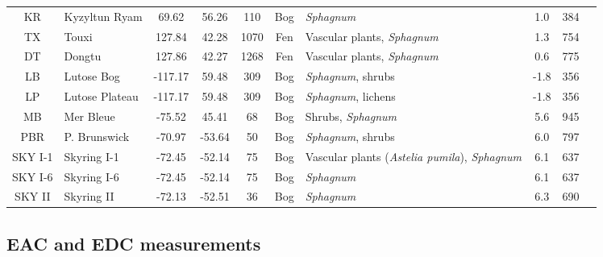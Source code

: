 \documentclass[alpha-refs]{wiley-article-rmd}
\begin{document}
\begin{refsection}
\begin{landscape}
\begin{table}
{\begin{tabular}[t]{clcccc>{\raggedright\arraybackslash}p{4cm}cc>{\raggedright\arraybackslash}p{4cm}}
\addlinespace
KR & Kyzyltun Ryam & 69.62 & 56.26 & 110 & Bog & \emph{Sphagnum} & 1.0 & 384 & \textcite{Larina.2013}\\
TX & Touxi & 127.84 & 42.28 & 1070 & Fen & Vascular plants, \emph{Sphagnum} & 1.3 & 754 & \\
DT & Dongtu & 127.86 & 42.27 & 1268 & Fen & Vascular plants, \emph{Sphagnum} & 0.6 & 775 & \\
LB & Lutose Bog & -117.17 & 59.48 & 309 & Bog & \emph{Sphagnum}, shrubs & -1.8 & 356 & \textcite{Heffernan.2020}\\
LP & Lutose Plateau & -117.17 & 59.48 & 309 & Bog & \emph{Sphagnum}, lichens & -1.8 & 356 & \textcite{Heffernan.2020}\\
\addlinespace
MB & Mer Bleue & -75.52 & 45.41 & 68 & Bog & Shrubs, \emph{Sphagnum} & 5.6 & 945 & \textcite{Elliott.2012}\\
PBR & P. Brunswick & -70.97 & -53.64 & 50 & Bog & \emph{Sphagnum}, shrubs & 6.0 & 797 & \textcite{Broder.2012}\\
SKY I-1 & Skyring I-1 & -72.45 & -52.14 & 75 & Bog & Vascular plants (\emph{Astelia pumila}), \emph{Sphagnum} & 6.1 & 637 & \textcite{Mathijssen.2019}\\
SKY I-6 & Skyring I-6 & -72.45 & -52.14 & 75 & Bog & \emph{Sphagnum} & 6.1 & 637 & \textcite{Mathijssen.2019}\\
SKY II & Skyring II & -72.13 & -52.51 & 36 & Bog & \emph{Sphagnum} & 6.3 & 690 & \textcite{Broder.2012}\\
\bottomrule
\end{tabular}}
\end{table}
\end{landscape}

\hypertarget{eac-and-edc-measurements}{%
\subsection{EAC and EDC measurements}\label{eac-and-edc-measurements}}


\end{refsection}
\end{document}
